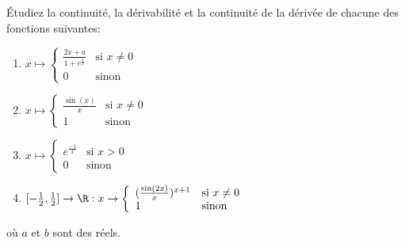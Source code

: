 
\begin{exercice}\label{exo0036}

Étudiez la continuité, la dérivabilité et la continuité de la dérivée de chacune des fonctions suivantes:
\begin{enumerate}
\item $x \mapsto \left\{ \begin{array}{ll} \frac{2x+a}{1+e^{\frac{1}{x}}} & \mbox{si } x \not= 0 \\ 0 & \mbox{sinon} \end{array} \right.  $
\item $x \mapsto \left\{ \begin{array}{ll} \frac{\sin(x)}{x} & \mbox{si } x \not= 0 \\ 1 & \mbox{sinon} \end{array} \right. $
\item $x \mapsto \left\{ \begin{array}{ll} e^{\frac{-1}{x}} & \mbox{si } x > 0 \\ 0 & \mbox{sinon} \end{array} \right. $
\item $[-\frac{1}{2}, \frac{1}{2}] \rightarrow \R: x \rightarrow \left\{ \begin{array}{ll} (\frac{\sin(2x)}{x})^{x+1} & \mbox{si } x \not= 0 \\ 1 & \mbox{sinon} \end{array} \right. $
\end{enumerate}
où $a$ et $b$ sont des réels.



\end{exercice}
